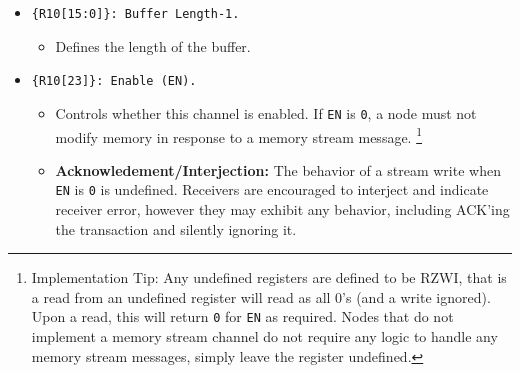 \begin{itemize}
\begin{itemize}
\begin{itemize}
          reached the end of the stream buffer.
        \item The {\tt DBLB} bit is set if the write that generated this alert
          reached the halfway point of the stream buffer and double-buffering
          is active for this stream.
        \item The {\tt OVFL} bit is set if the write that generated this alert
          reached the end of the stream buffer and there was already a pending
          alert with the {\tt WRP} bit set or if the write that generated this
          alert reached the halfway point of the stream buffer and double
          buffering is active for this stream and there was already a pending
          alert with the {\tt DBLB} bit set.
      \end{itemize}
    \item \hl{TODO: What happens if a node wishes to alert itself? e.g. a CPU
        that puts itself to sleep but wants to be interrupted when 1,000
      samples have been written to memory?}
    \end{itemize}
  \item {\tt \{R10[15:0]\}: Buffer Length-1.}
    \begin{itemize}
      \item Defines the length of the buffer.
    \end{itemize}
  \item {\tt \{R10[23]\}: Enable (EN).}
    \begin{itemize}
      \item Controls whether this channel is enabled. If {\tt EN} is {\tt 0},
        a node must not modify memory in response to a memory stream message.%
        \footnote{
          Implementation Tip: Any undefined \proto registers are defined to be
          RZWI, that is a read from an undefined register will read as all 0's
          (and a write ignored). Upon a read, this will return {\tt 0} for
          {\tt EN} as required.  Nodes that do not implement a memory stream
          channel do not require any logic to handle any memory stream
          messages, simply leave the register undefined.
        }
      \item {\bf Acknowledement/Interjection:} The behavior of a stream write
        when {\tt EN} is {\tt 0} is undefined. Receivers are encouraged to
        interject and indicate receiver error, however they may exhibit any
        behavior, including ACK'ing the transaction and silently ignoring it.
    \end{itemize}

\end{itemize}
